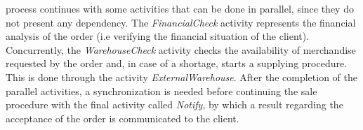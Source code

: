 \documentclass{llncs}
\begin{document}
process continues with some activities that can be done in parallel,
since they do not present any dependency. The \emph{FinancialCheck}
activity represents the financial analysis of the order  (i.e
verifying the financial situation of the client). Concurrently, the
\emph{WarehouseCheck} activity checks the availability of merchandise
requested by the order and, in case of a shortage, starts a supplying procedure. This is done through the activity \emph{ExternalWarehouse}. After the completion of the  parallel activities, a synchronization is needed before continuing the sale procedure with the final activity called \emph{Notify}, by which a result regarding the acceptance of the order is communicated to the client.

\end{document}
